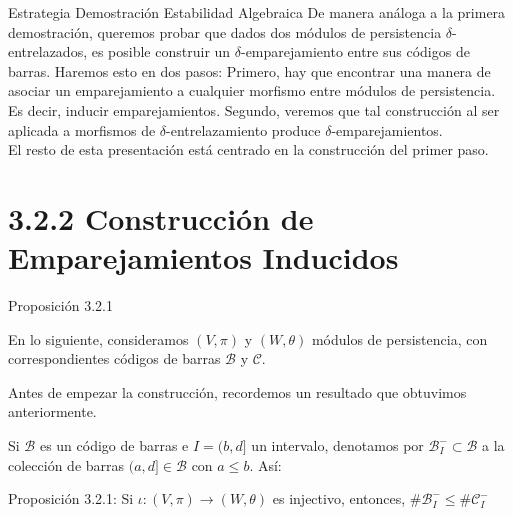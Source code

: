 \documentclass{beamer}
\begin{document}
\begin{frame}{Estrategia Demostración Estabilidad Algebraica}
De manera análoga a la primera demostración, queremos probar que dados dos módulos de persistencia $\delta$-entrelazados, es posible construir un $\delta$-emparejamiento entre sus códigos de barras.
\pause
Haremos esto en dos pasos: Primero, hay que encontrar una manera de asociar un emparejamiento a cualquier morfismo entre módulos de persistencia. Es decir, inducir emparejamientos. 
\pause
Segundo, veremos que tal construcción al ser aplicada a morfismos de $\delta$-entrelazamiento produce $\delta$-emparejamientos.\\ 
\pause
El resto de esta presentación está centrado en la construcción del primer paso. 
\end{frame}

\section{3.2.2 Construcción de Emparejamientos Inducidos}
\begin{frame}{Proposición 3.2.1}

En lo siguiente, consideramos \((V,\pi)\) y \((W,\theta)\) módulos de persistencia, con correspondientes códigos de barras \(\mathcal{B}\) y \(\mathcal{C}\).
\pause

Antes de empezar la construcción, recordemos un resultado que obtuvimos anteriormente. 
\pause

Si \(\mathcal{B}\) es un código de barras e \(I=(b,d]\) un intervalo, denotamos por \(\mathcal{B}^-_I\subset\mathcal{B}\) a la colección de barras \((a,d]\in\mathcal{B}\) con \(a\leq b\). Así:

\begin{block}{Proposición 3.2.1:}
Si \(\iota:(V,\pi)\to(W,\theta)\) es injectivo, entonces, \(\#\mathcal{B}^-_I\leq\#\mathcal{C}^-_I\)

\end{block}

\end{frame}
\end{document}
